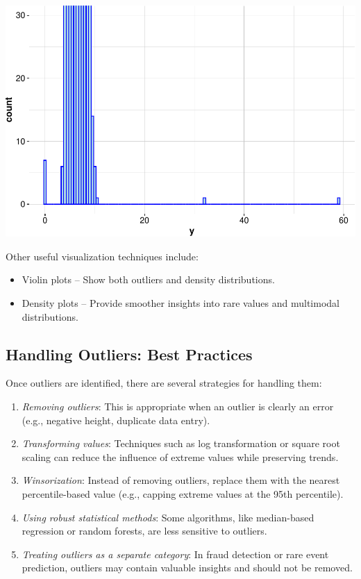\documentclass[
]{book}
\providecommand{\tightlist}{%
  \setlength{\itemsep}{0pt}\setlength{\parskip}{0pt}}
\theoremstyle{definition}
\theoremstyle{definition}
\theoremstyle{definition}
\theoremstyle{definition}
\theoremstyle{remark}
\begin{document}
\begin{center}\includegraphics[width=0.7\linewidth]{data-preparation_files/figure-latex/unnamed-chunk-7-1} \end{center}

Other useful visualization techniques include:

\begin{itemize}
\tightlist
\item
  Violin plots -- Show both outliers and density distributions.
\item
  Density plots -- Provide smoother insights into rare values and multimodal distributions.
\end{itemize}

\subsection*{Handling Outliers: Best Practices}\label{handling-outliers-best-practices}

Once outliers are identified, there are several strategies for handling them:

\begin{enumerate}
\def\labelenumi{\arabic{enumi}.}
\tightlist
\item
  \emph{Removing outliers}: This is appropriate when an outlier is clearly an error (e.g., negative height, duplicate data entry).
\item
  \emph{Transforming values}: Techniques such as log transformation or square root scaling can reduce the influence of extreme values while preserving trends.
\item
  \emph{Winsorization}: Instead of removing outliers, replace them with the nearest percentile-based value (e.g., capping extreme values at the 95th percentile).
\item
  \emph{Using robust statistical methods}: Some algorithms, like median-based regression or random forests, are less sensitive to outliers.
\item
  \emph{Treating outliers as a separate category}: In fraud detection or rare event prediction, outliers may contain valuable insights and should not be removed.
\end{enumerate}
\end{document}
